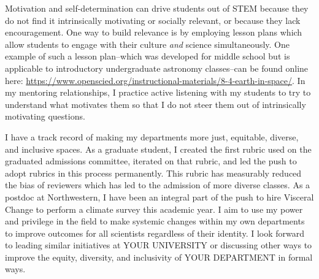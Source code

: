 \documentclass[11pt]{article}
\begin{document}
Motivation and self-determination can drive students out of STEM because they do not find it intrinsically motivating or socially relevant, or because they lack encouragement.
One way to build relevance is by employing lesson plans which allow students to engage with their culture \emph{and} science simultaneously.
One example of such a lesson plan--which was developed for middle school but is applicable to introductory undergraduate astronomy classes--can be found online here: \url{https://www.openscied.org/instructional-materials/8-4-earth-in-space/}.
In my mentoring relationships, I practice active listening \citep{jahromi_etal_2016} with my students to try to understand what motivates them so that I do not steer them out of intrinsically motivating questions.

I have a track record of making my departments more just, equitable, diverse, and inclusive spaces.
As a graduate student, I created the first rubric used on the graduated admissions committee, iterated on that rubric, and led the push to adopt rubrics in this process permanently.
This rubric has measurably reduced the bias of reviewers which has led to the admission of more diverse classes.
As a postdoc at Northwestern, I have been an integral part of the push to hire Visceral Change to perform a climate survey this academic year.
I aim to use my power and privilege in the field to make systemic changes within my own departments to improve outcomes for all scientists regardless of their identity.
I look forward to leading similar initiatives at YOUR UNIVERSITY or discussing other ways to improve the equity, diversity, and inclusivity of YOUR DEPARTMENT in formal ways.
\end{document}
